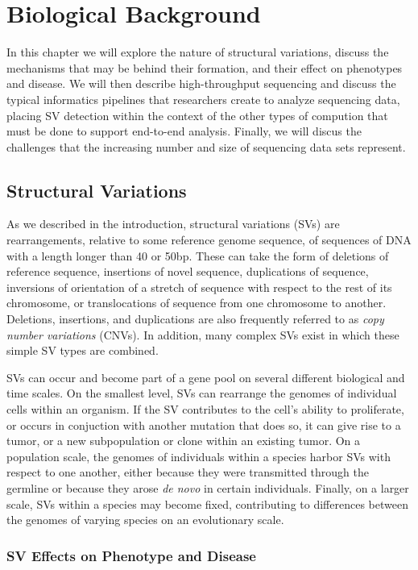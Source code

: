 \chapter{Biological Background}\label{chap_background}

In this chapter we will explore the nature of structural variations, discuss the mechanisms that may be behind their formation, and their effect on phenotypes and disease. We will then describe high-throughput sequencing and discuss the typical informatics pipelines that researchers create to analyze sequencing data, placing SV detection within the context of the other types of compution that must be done to support end-to-end analysis. Finally, we will discus the challenges that the increasing number and size of sequencing data sets represent.

\section{Structural Variations}

As we described in the introduction, structural variations (SVs) are rearrangements, relative to some reference genome sequence, of sequences of DNA with a length longer than 40 or 50bp. These can take the form of deletions of reference sequence, insertions of novel sequence, duplications of sequence, inversions of orientation of a stretch of sequence with respect to the rest of its chromosome, or translocations of sequence from one chromosome to another. Deletions, insertions, and duplications are also frequently referred to as \emph{copy number variations} (CNVs). In addition, many complex SVs exist in which these simple SV types are combined.

SVs can occur and become part of a gene pool on several different biological and time scales. On the smallest level, SVs can rearrange the genomes of individual cells within an organism. If the SV contributes to the cell's ability to proliferate, or occurs in conjuction with another mutation that does so, it can give rise to a tumor, or a new subpopulation or clone within an existing tumor. On a population scale, the genomes of individuals within a species harbor SVs with respect to one another, either because they were transmitted through the germline or because they arose \emph{de novo} in certain individuals. Finally, on a larger scale, SVs within a species may become fixed, contributing to differences between the genomes of varying species on an evolutionary scale.

\subsection{SV Effects on Phenotype and Disease}

